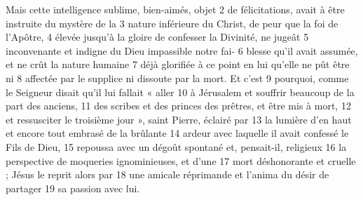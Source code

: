 Mais cette intelligence sublime, bien-aimés, objet	 
2	 	de félicitations, avait à être instruite du mystère de la	 
3	 	nature inférieure du Christ, de peur que la foi de l'Apôtre,	 
4	 	élevée jusqu'à la gloire de confesser la Divinité, ne jugeât	 
5	 	inconvenante et indigne du Dieu impassible notre fai-	 
6	 	blesse qu'il avait assumée, et ne crût la nature humaine	 
7	 	déjà glorifiée à ce point en lui qu'elle ne pût être ni	 
8	 	affectée par le supplice ni dissoute par la mort. Et c'est	 
9	 	pourquoi, comme le Seigneur disait qu'il lui fallait « aller	 
10	 	à Jérusalem et souffrir beaucoup de la part des anciens,	 
11	 	des scribes et des princes des prêtres, et être mis à mort,	 
12	 	et ressusciter le troisième jour », saint Pierre, éclairé par	 
13	 	la lumière d'en haut et encore tout embrasé de la brûlante	 
14	 	ardeur avec laquelle il avait confessé le Fils de Dieu,	 
15	 	repoussa avec un dégoût spontané et, pensait-il, religieux	 
16	 	la perspective de moqueries ignominieuses, et d'une	 
17	 	mort déshonorante et cruelle ; Jésus le reprit alors par	 
18	 	une amicale réprimande et l'anima du désir de partager	 
19	 	sa passion avec lui.